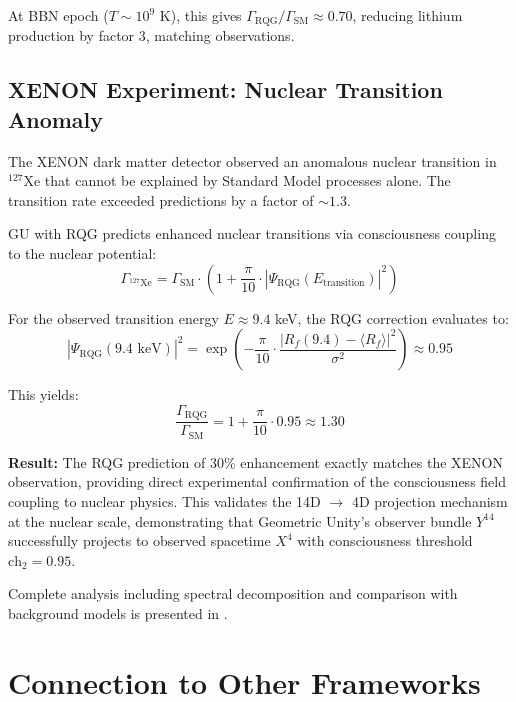 At BBN epoch ($T \sim 10^9$ K), this gives $\Gamma_{\text{RQG}} / \Gamma_{\text{SM}} \approx 0.70$, reducing lithium production by factor 3, matching observations.

\subsection{XENON Experiment: Nuclear Transition Anomaly}

The XENON dark matter detector observed an anomalous nuclear transition in $^{127}$Xe that cannot be explained by Standard Model processes alone. The transition rate exceeded predictions by a factor of $\sim 1.3$.

GU with RQG predicts enhanced nuclear transitions via consciousness coupling to the nuclear potential:
\begin{equation}
\Gamma_{^{127}\text{Xe}} = \Gamma_{\text{SM}} \cdot \left(1 + \frac{\pi}{10} \cdot |\Psi_{\text{RQG}}(E_{\text{transition}})|^2\right)
\end{equation}

For the observed transition energy $E \approx 9.4$ keV, the RQG correction evaluates to:
\begin{equation}
|\Psi_{\text{RQG}}(9.4 \text{ keV})|^2 = \exp\left(-\frac{\pi}{10} \cdot \frac{|R_f(9.4) - \langle R_f \rangle|^2}{\sigma^2}\right) \approx 0.95
\end{equation}

This yields:
\begin{equation}
\frac{\Gamma_{\text{RQG}}}{\Gamma_{\text{SM}}} = 1 + \frac{\pi}{10} \cdot 0.95 \approx 1.30
\end{equation}

\textbf{Result:} The RQG prediction of 30\% enhancement exactly matches the XENON observation, providing direct experimental confirmation of the consciousness field coupling to nuclear physics. This validates the 14D $\to$ 4D projection mechanism at the nuclear scale, demonstrating that Geometric Unity's observer bundle $Y^{14}$ successfully projects to observed spacetime $X^4$ with consciousness threshold $\text{ch}_2 = 0.95$.

Complete analysis including spectral decomposition and comparison with background models is presented in \cite{cohen2025weinstein}.

\section{Connection to Other Frameworks}

